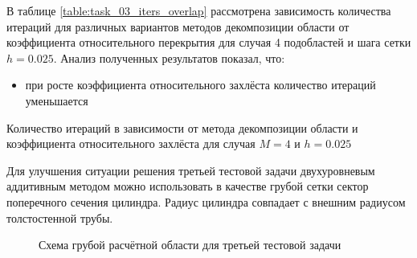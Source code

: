 \documentclass[a4paper]{article}
\begin{document}
В таблице \ref{table:task_03_iters_overlap} рассмотрена зависимость количества итераций для различных вариантов методов декомпозиции области от коэффициента относительного перекрытия для случая 4 подобластей и шага сетки $h = 0.025$. Анализ полученных результатов показал, что:
\begin{itemize}
\item при росте коэффициента относительного захлёста количество итераций уменьшается
\end{itemize}

\begin{table}[h]
\caption{Количество итераций в зависимости от метода декомпозиции области и коэффициента относительного захлёста для случая $M = 4$ и $h = 0.025$}
\label{table:task_03_iters_overlap}
\end{table}

\newpage

Для улучшения ситуации решения третьей тестовой задачи двухуровневым аддитивным методом можно использовать в качестве грубой сетки сектор поперечного сечения цилиндра. Радиус цилиндра совпадает с внешним радиусом толстостенной трубы.

\begin{figure}[h]
\caption{Схема грубой расчётной области для третьей тестовой задачи}
\label{fig:task_03_area_coarse_1}
\end{figure}
\end{document}
